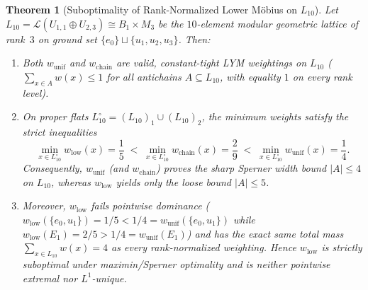 \documentclass[11pt]{article}
\newtheorem{theorem}{Theorem}[section]
\theoremstyle{definition}
\theoremstyle{remark}
\begin{document}
\begin{theorem}[Suboptimality of Rank-Normalized Lower M\"obius on $L_{10}$]\label{thm:L10}
Let $L_{10} = \mathcal{L}(U_{1,1} \oplus U_{2,3}) \cong B_1 \times M_3$ be the $10$-element modular geometric lattice of rank~$3$ on ground set $\{e_0\} \sqcup \{u_1, u_2, u_3\}$. Then:
\begin{enumerate}
\item[(a)] Both $w_{\mathrm{unif}}$ and $w_{\mathrm{chain}}$ are valid, constant-tight LYM weightings on $L_{10}$ ($\sum_{x \in A} w(x) \le 1$ for all antichains $A \subseteq L_{10}$, with equality $1$ on every rank level).
\item[(b)] On proper flats $L_{10}^\circ = (L_{10})_1 \cup (L_{10})_2$, the minimum weights satisfy the strict inequalities
\begin{equation}\label{eq:L10-maximin}
  \min_{x \in L_{10}^\circ} w_{\mathrm{low}}(x) = \frac{1}{5}
  \;<\; \min_{x \in L_{10}^\circ} w_{\mathrm{chain}}(x) = \frac{2}{9}
  \;<\; \min_{x \in L_{10}^\circ} w_{\mathrm{unif}}(x) = \frac{1}{4}.
\end{equation}
Consequently, $w_{\mathrm{unif}}$ (and $w_{\mathrm{chain}}$) proves the sharp Sperner width bound $|A| \le 4$ on $L_{10}$, whereas $w_{\mathrm{low}}$ yields only the loose bound $|A| \le 5$.
\item[(c)] Moreover, $w_{\mathrm{low}}$ fails pointwise dominance ($w_{\mathrm{low}}(\{e_0, u_1\}) = 1/5 < 1/4 = w_{\mathrm{unif}}(\{e_0, u_1\})$ while $w_{\mathrm{low}}(E_1) = 2/5 > 1/4 = w_{\mathrm{unif}}(E_1)$) and has the exact same total mass $\sum_{x \in L_{10}} w(x) = 4$ as every rank-normalized weighting. Hence $w_{\mathrm{low}}$ is strictly suboptimal under maximin/Sperner optimality and is neither pointwise extremal nor $L^1$-unique.
\end{enumerate}
\end{theorem}
\end{document}
